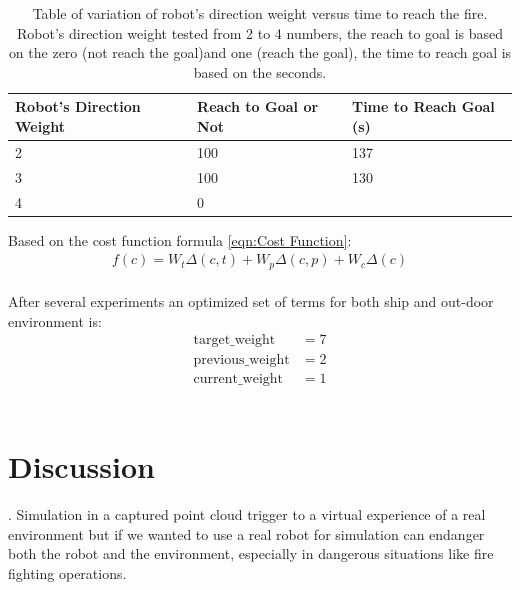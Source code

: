 \begin{table}[ht!]
\centering
    \begin{tabular}{ m{3cm} m{5cm} m{5cm} } 
    \toprule
    \toprule
    \textbf{Robot's Direction Weight} & \textbf{Reach to Goal or Not} & \textbf{Time to Reach Goal (s)} \\
    \midrule
    2      & 100       & 137   \\[1.3ex]
    3      & 100     & 130   \\[1.3ex]
    4      & 0     &    \\[1.3ex]
    
 
    \bottomrule
    \bottomrule
\end{tabular}
\caption[Variation of Robot's Direction Weight Versus Time to Reach the fire on a Ship's Deck]{Table of variation of robot's direction weight versus time to reach the fire. Robot's direction weight tested from 2 to 4 numbers, the reach to goal is based on the zero (not reach the goal)and one (reach the goal), the time to reach goal is based on the seconds. }
\label{table:Variation of Robot's Direction Weight Versus Time to Reach the Goal on the Ship}
\end{table} 
\noindent Based on the cost function formula \eqref{eqn:Cost Function}: 
\begin{equation}
\begin{aligned}
f(c) = W_t \Delta(c,t) + W_p \Delta ( c , p) + W_c \Delta (c)
\end{aligned}
\label{eqn:Cost Function}
\end{equation} 
\\

After several experiments an optimized set of terms for both ship and out-door environment is: 
\begin{align*}
\text{target\_weight} &= 7 \\
\text{previous\_weight} &= 2 \\
\text{current\_weight} &= 1
\end{align*}
\\




\vspace{20cm}

\section{Discussion}

. Simulation in a captured point cloud trigger to a virtual experience of a real environment but if we wanted to use a real robot for simulation can endanger both the robot and the environment, especially in dangerous situations like fire fighting operations.\\


